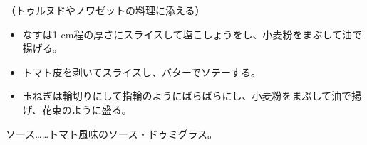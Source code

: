 \begin{recette}

（トゥルヌドやノワゼットの料理に添える）

\begin{itemize}
\item
  なすは1
  cm程の厚さにスライスして塩こしょうをし、小麦粉をまぶして油で揚げる。
\item
  トマト皮を剥いてスライスし、バターでソテーする。
\item
  玉ねぎは輪切りにして指輪のようにばらばらにし、小麦粉をまぶして油で揚げ、花束のように盛る。
\end{itemize}

\ul{ソース}\ldots{}\ldots{}トマト風味の\protect\hyperlink{sauce-demi-glace}{ソース・ドゥミグラス}。

\hypertarget{garniture-banquiere}{%
}
\end{recette}
